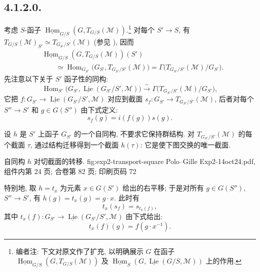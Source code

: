 \subsection*{4.1.2.0.}
考虑 \(S\)-函子
\(
  \underline{\operatorname{Hom}}_{G/S}
    (G,T_{G/S}(\mathcal M)).
\)\footnote{编者注: 下文对原文作了扩充, 以明确展示 \(G\) 在函子
\(\underline{\operatorname{Hom}}_{G/S}(G,T_{G/S}(\mathcal M))\) 及
\(\underline{\operatorname{Hom}}_S
(G,\underline{\operatorname{Lie}}(G/S,\mathcal M))\) 上的作用.}
对每个 \(S'\to S\), 有
\(T_{G/S}(\mathcal M)_{S'}\simeq T_{G_{S'}/S'}(\mathcal M)\)
(参见 ), 因而
\[
\begin{aligned}
 &\underline{\operatorname{Hom}}_{G/S}
   (G,T_{G/S}(\mathcal M))(S')\\
 &\qquad\simeq
 \operatorname{Hom}_{G_{S'}}
   \bigl(G_{S'},T_{G_{S'}/S'}(\mathcal M)\bigr)
 =\Gamma\bigl(T_{G_{S'}/S'}(\mathcal M)/G_{S'}\bigr).
\end{aligned}
\]
先注意以下关于 \(S'\) 函子性的同构:
\begin{equation}
 \operatorname{Hom}_{S'}
  \bigl(G_{S'},\underline{\operatorname{Lie}}(G_{S'}/S',\mathcal M)\bigr)
 \xrightarrow{\sim}
 \Gamma\bigl(T_{G_{S'}/S'}(\mathcal M)/G_{S'}\bigr),
 \tag{*}\label{sga3:ii:subsection:4-1-2-0:equation:star}
\end{equation}
它把 \(f:G_{S'}\to
\underline{\operatorname{Lie}}(G_{S'}/S',\mathcal M)\) 对应到截面
\(s_f:G_{S'}\to T_{G_{S'}/S'}(\mathcal M)\), 后者对每个
\(S''\to S'\) 和 \(g\in G(S'')\) 由下式定义:
\[
  s_f(g)=i(f(g))s(g).
\]

设 \(h\) 是 \(S'\) 上函子 \(G_{S'}\) 的一个自同构, 不要求它保持群结构.
对 \(T_{G_{S'}/S'}(\mathcal M)\) 的每个截面 \(\tau\), 通过结构迁移得到一个截面
\(h(\tau)\): 它是使下图交换的唯一截面.

  {自同构 \(h\) 对切截面的转移.}
  {fig:exp2-transport-square}
  {Polo--Gille Exp2-14oct24.pdf, 组件内第 24 页; 合卷第 82 页; 印刷页码 72}

特别地, 取 \(h=t_x\) 为元素 \(x\in G(S')\) 给出的右平移;
于是对所有 \(g\in G(S'')\), \(S''\to S'\), 有 \(h(g)=t_x(g)=g\cdot x\).
此时有
\[
  t_x(s_f)=s_{t_x(f)},
\]
其中 \(t_x(f):G_{S'}\to
\underline{\operatorname{Lie}}(G_{S'}/S',\mathcal M)\) 由下式给出:
\[
  t_x(f)(g)=f(g\cdot x^{-1}).
\]

